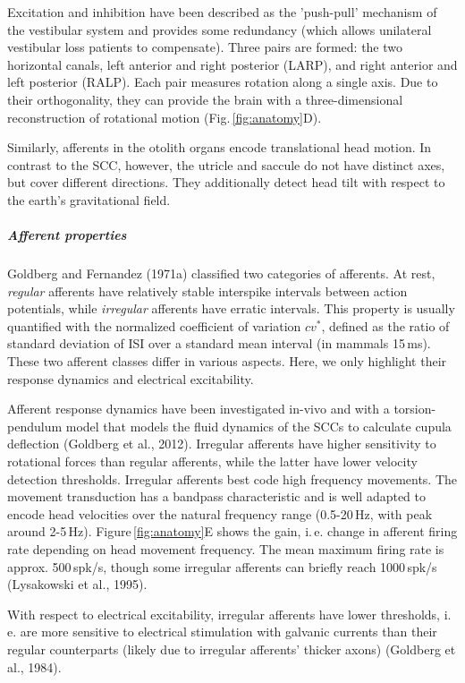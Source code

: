 Excitation and inhibition have been described as the 'push-pull' mechanism of the vestibular system and provides some redundancy (which allows unilateral vestibular loss patients to compensate). Three pairs are formed: the two horizontal canals, left anterior and right posterior (LARP), and right anterior and left posterior (RALP). Each pair measures rotation along a single axis. Due to their orthogonality, they can provide the brain with a three-dimensional reconstruction of rotational motion (Fig.\,\ref{fig:anatomy}D).  

Similarly, afferents in the otolith organs encode translational head motion. In contrast to the SCC, however, the utricle and saccule do not have distinct axes, but cover different directions. They additionally detect head tilt with respect to the earth's gravitational field.

\subparagraph{Afferent properties}
Goldberg and Fernandez (1971a) classified two categories of afferents. At rest, \emph{regular} afferents have relatively stable interspike intervals between action potentials, while  \emph{irregular} afferents have erratic intervals. This property is usually quantified with the normalized coefficient of variation $cv^*$, defined as the ratio of standard deviation of ISI over a standard mean interval (in mammals 15\,ms). These two afferent classes differ in various  aspects. Here, we only highlight their response dynamics and electrical excitability.

Afferent response dynamics have been investigated in-vivo and with a torsion-pendulum model  that models the fluid dynamics of the SCCs to calculate cupula deflection (Goldberg et al., 2012). Irregular afferents have higher sensitivity to rotational forces than regular afferents, while the latter have lower velocity detection thresholds. Irregular afferents best code high frequency movements. The movement transduction has a bandpass characteristic and is well adapted to encode head velocities over the natural frequency range (0.5-20\,Hz, with peak around 2-5\,Hz). Figure\,\ref{fig:anatomy}E shows the gain, i.\,e. change in afferent firing rate depending on head movement frequency. The mean maximum firing rate is approx. 500\,spk/s, though some irregular afferents can briefly reach 1000\,spk/s (Lysakowski et al., 1995). 

With respect to electrical excitability, irregular afferents have lower thresholds, i.\,e. are more sensitive to electrical stimulation with galvanic currents than their regular counterparts (likely due to irregular afferents' thicker axons) (Goldberg et al., 1984).

